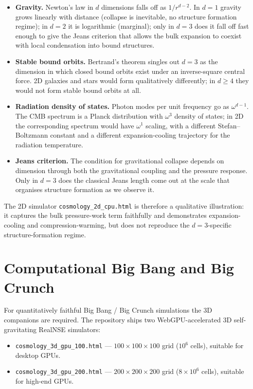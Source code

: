 \begin{itemize}
\item \textbf{Gravity.} Newton's law in $d$ dimensions falls off as
$1/r^{d-2}$. In $d=1$ gravity grows linearly with distance
(collapse is inevitable, no structure formation regime); in $d=2$
it is logarithmic (marginal); only in $d=3$ does it fall off fast
enough to give the Jeans criterion that allows the bulk expansion
to coexist with local condensation into bound structures.

\item \textbf{Stable bound orbits.} Bertrand's theorem singles out
$d=3$ as the dimension in which closed bound orbits exist under an
inverse-square central force. 2D galaxies and stars would form
qualitatively differently; in $d \geq 4$ they would not form stable
bound orbits at all.

\item \textbf{Radiation density of states.} Photon modes per unit
frequency go as $\omega^{d-1}$. The CMB spectrum is a Planck
distribution with $\omega^3$ density of states; in 2D the
corresponding spectrum would have $\omega^1$ scaling, with a
different Stefan--Boltzmann constant and a different
expansion-cooling trajectory for the radiation temperature.

\item \textbf{Jeans criterion.} The condition for gravitational
collapse depends on dimension through both the gravitational
coupling and the pressure response. Only in $d=3$ does the
classical Jeans length come out at the scale that organises
structure formation as we observe it.
\end{itemize}

The 2D simulator \texttt{cosmology\_2d\_cpu.html} is therefore a
qualitative illustration: it captures the bulk pressure-work term
faithfully and demonstrates expansion-cooling and
compression-warming, but does not reproduce the $d=3$-specific
structure-formation regime.

\section{Computational Big Bang and Big Crunch}

For quantitatively faithful Big Bang / Big Crunch simulations the
3D companions are required. The repository ships two
WebGPU-accelerated 3D self-gravitating RealNSE simulators:

\begin{itemize}
\item \texttt{cosmology\_3d\_gpu\_100.html} --- $100 \times 100 \times
100$ grid ($10^6$ cells), suitable for desktop GPUs.
\item \texttt{cosmology\_3d\_gpu\_200.html} --- $200 \times 200 \times
200$ grid ($8 \times 10^6$ cells), suitable for high-end GPUs.
\end{itemize}

